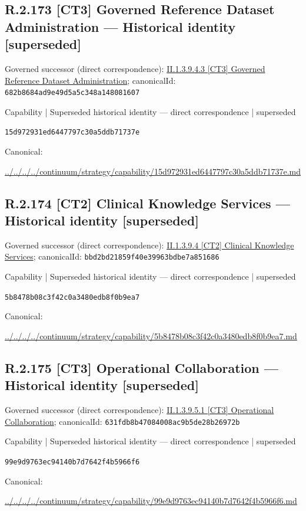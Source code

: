 \documentclass[10pt,a4paper]{article}
\begin{document}
\subsection*{R.2.173 [CT3] Governed Reference Dataset Administration — Historical identity [superseded]}
Governed successor (direct correspondence): \hyperref[element-682b8684ad9e49d5a5c348a148081607]{II.1.3.9.4.3 [CT3] Governed Reference Dataset Administration}; canonicalId: \texttt{682b8684ad9e49d5a5c348a148081607}\par
\label{element-15d972931ed6447797c30a5ddb71737e}
{\small Capability | Superseded historical identity — direct correspondence | superseded}\par
\texttt{15d972931ed6447797c30a5ddb71737e}\par
Canonical: \par
{\footnotesize\url{../../../../continuum/strategy/capability/15d972931ed6447797c30a5ddb71737e.md}}\par
\subsection*{R.2.174 [CT2] Clinical Knowledge Services — Historical identity [superseded]}
Governed successor (direct correspondence): \hyperref[element-bbd2bd21859f40e39963bdbe7a851686]{II.1.3.9.4 [CT2] Clinical Knowledge Services}; canonicalId: \texttt{bbd2bd21859f40e39963bdbe7a851686}\par
\label{element-5b8478b08c3f42c0a3480edb8f0b9ea7}
{\small Capability | Superseded historical identity — direct correspondence | superseded}\par
\texttt{5b8478b08c3f42c0a3480edb8f0b9ea7}\par
Canonical: \par
{\footnotesize\url{../../../../continuum/strategy/capability/5b8478b08c3f42c0a3480edb8f0b9ea7.md}}\par
\subsection*{R.2.175 [CT3] Operational Collaboration — Historical identity [superseded]}
Governed successor (direct correspondence): \hyperref[element-631fdb8b47084008ac9b5de28b26972b]{II.1.3.9.5.1 [CT3] Operational Collaboration}; canonicalId: \texttt{631fdb8b47084008ac9b5de28b26972b}\par
\label{element-99e9d9763ec94140b7d7642f4b5966f6}
{\small Capability | Superseded historical identity — direct correspondence | superseded}\par
\texttt{99e9d9763ec94140b7d7642f4b5966f6}\par
Canonical: \par
{\footnotesize\url{../../../../continuum/strategy/capability/99e9d9763ec94140b7d7642f4b5966f6.md}}\par
\end{document}
